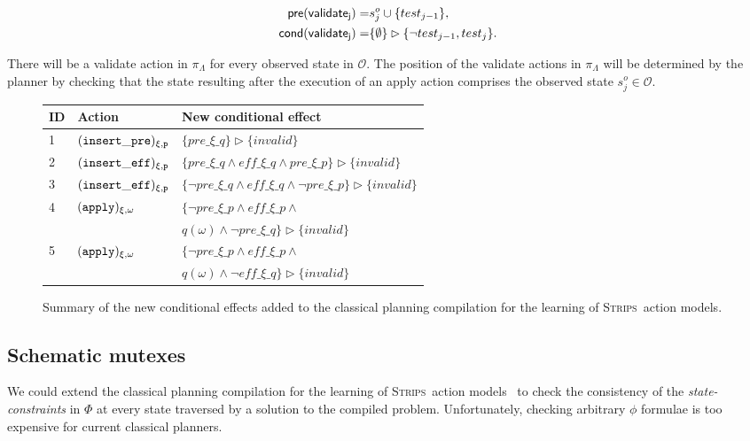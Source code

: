 \documentclass[letterpaper]{article} %
\newcommand{\pre}{\mathsf{pre}}     %
\newcommand{\cond}{\mathsf{cond}}   %
\newcommand{\strips}{\textsc{Strips}}     %
\begin{document}
\begin{small}
\begin{align*}
\hspace*{7pt}\pre(\mathsf{validate_{j}})=&s_j^o\cup\{test_{j-1}\},\\
\cond(\mathsf{validate_{j}})=&\{\emptyset\}\rhd\{\neg test_{j-1}, test_j\}.
\end{align*}
\end{small}

There will be a validate action in $\pi_\Lambda$ for every observed state in $\mathcal{O}$. The position of the validate actions in $\pi_\Lambda$ will be determined by the planner by checking that the state resulting after the execution of an apply action comprises the observed state $s_j^o\in\mathcal{O}$.


\begin{figure}
	\begin{scriptsize}
		\begin{tabular}{lll}
			{\bf ID} & {\bf Action} & {\bf New conditional effect}\\\hline
			1&${\tt (insert\_pre)_{\xi,p}}$&$\{pre\_\xi\_q\}\rhd\{invalid\}$\\
			2&${\tt (insert\_eff)_{\xi,p}}$&$\{pre\_\xi\_q\wedge eff\_\xi\_q\wedge pre\_\xi\_p\}\rhd\{invalid\}$\\
			3&${\tt (insert\_eff)_{\xi,p}}$&$\{\neg pre\_\xi\_q\wedge eff\_\xi\_q\wedge \neg pre\_\xi\_p\}\rhd\{invalid\}$\\
			4&${\tt (apply)_{\xi,\omega}}$&$\{\neg pre\_\xi\_p \wedge eff\_\xi\_p \wedge $\\
			&&$q(\omega)\wedge \neg pre\_\xi\_q\}\rhd\{invalid\}$\\
			5&${\tt (apply)_{\xi,\omega}}$&$\{\neg pre\_\xi\_p \wedge eff\_\xi\_p \wedge $\\
			&&$q(\omega)\wedge \neg eff\_\xi\_q\}\rhd\{invalid\}$
		\end{tabular}
	\end{scriptsize}
	\caption{\small Summary of the new conditional effects added to the classical planning compilation for the learning of \strips\ action models.}
	\label{fig:ceffects}
\end{figure}


\subsection{Schematic mutexes}
We could extend the classical planning compilation for the learning of \strips\ action models~\cite{aineto2018learning} to check the consistency of the {\em state-constraints} in $\Phi$ at every state traversed by a solution to the compiled problem. Unfortunately, checking arbitrary $\phi$ formulae is too expensive for current classical planners.
\end{document}
